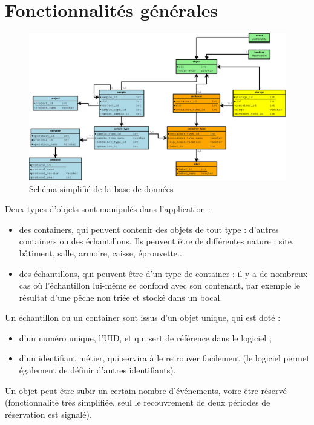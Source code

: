 \section{Fonctionnalités générales}

\begin{figure}[th]
\includegraphics[width=\linewidth]{images/db_schema_simplifie}
\caption{Schéma simplifié de la base de données}
\end{figure}

Deux types d'objets sont manipulés dans l'application :
\begin{itemize}
\item des containers, qui peuvent contenir des objets de tout type : d'autres containers ou des échantillons. Ils peuvent être de différentes nature : site, bâtiment, salle, armoire, caisse, éprouvette...
\item des échantillons, qui peuvent être d'un type de container : il y a de nombreux cas où l'échantillon lui-même se confond avec son contenant, par exemple le résultat d'une pêche non triée et stocké dans un bocal.
\end{itemize}

Un échantillon ou un container sont issus d'un objet unique, qui est doté :
\begin{itemize}
\item d'un numéro unique, l'UID, et qui sert de référence dans le logiciel ;
\item d'un identifiant métier, qui servira à le retrouver facilement (le logiciel permet également de définir d'autres identifiants).
\end{itemize}

Un objet peut être subir un certain nombre d'événements, voire être réservé (fonctionnalité très simplifiée, seul le recouvrement de deux périodes de réservation est signalé).

